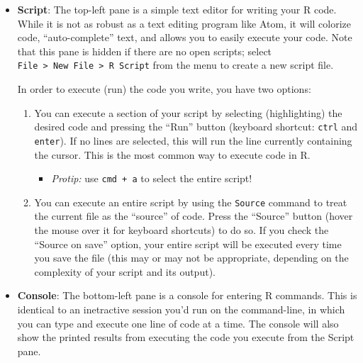 \documentclass[]{book}
\providecommand{\tightlist}{%
  \setlength{\itemsep}{0pt}\setlength{\parskip}{0pt}}
\theoremstyle{definition}
\theoremstyle{definition}
\theoremstyle{remark}
\begin{document}
\begin{itemize}
\item
  \textbf{Script}: The top-left pane is a simple text editor for writing
  your R code. While it is not as robust as a text editing program like
  Atom, it will colorize code, ``auto-complete'' text, and allows you to
  easily execute your code. Note that this pane is hidden if there are
  no open scripts; select
  \texttt{File\ \textgreater{}\ New\ File\ \textgreater{}\ R\ Script}
  from the menu to create a new script file.

  In order to execute (run) the code you write, you have two options:

  \begin{enumerate}
  \def\labelenumi{\arabic{enumi}.}
  \item
    You can execute a section of your script by selecting (highlighting)
    the desired code and pressing the ``Run'' button (keyboard shortcut:
    \texttt{ctrl} and \texttt{enter}). If no lines are selected, this
    will run the line currently containing the cursor. This is the most
    common way to execute code in R.

    \begin{itemize}
    \tightlist
    \item
      \emph{Protip:} use \texttt{cmd\ +\ a} to select the entire script!
    \end{itemize}
  \item
    You can execute an entire script by using the \texttt{Source}
    command to treat the current file as the ``source'' of code. Press
    the ``Source'' button (hover the mouse over it for keyboard
    shortcuts) to do so. If you check the ``Source on save'' option,
    your entire script will be executed every time you save the file
    (this may or may not be appropriate, depending on the complexity of
    your script and its output).
  \end{enumerate}
\item
  \textbf{Console}: The bottom-left pane is a console for entering R
  commands. This is identical to an inetractive session you'd run on the
  command-line, in which you can type and execute one line of code at a
  time. The console will also show the printed results from executing
  the code you execute from the Script pane.


\end{itemize}
\end{document}
